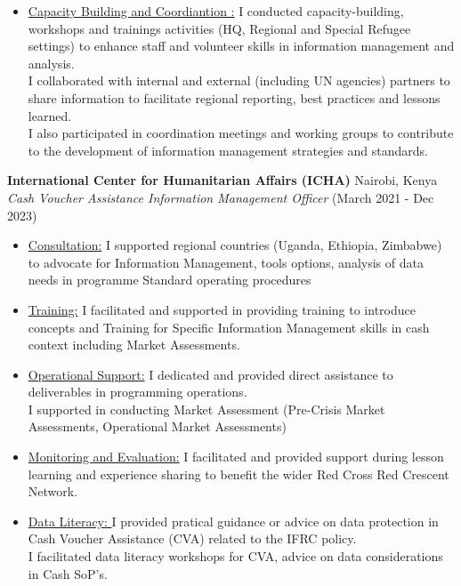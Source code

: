 \documentclass[line,margin,10pt]{res}
\begin{document}
\begin{resume}
\begin{itemize}
    \item \underline{Capacity Building and Coordiantion :}
    I conducted capacity-building, workshops and trainings activities (HQ, Regional and Special Refugee settings) to enhance staff and volunteer skills in information management and analysis.\\
    I collaborated with internal and external (including UN agencies) partners to share information to facilitate regional reporting, best practices and lessons learned.\\
    I also participated in coordination meetings and working groups to contribute to the development of information management strategies and standards.

\end{itemize}

\textbf{International Center for Humanitarian Affairs (ICHA)} \hfill Nairobi, Kenya\\
{\sl Cash Voucher Assistance Information Management Officer} \hfill (March 2021 - Dec 2023)
\begin{itemize} \itemsep -2pt
	\item \underline{Consultation:}
    I supported regional countries (Uganda, Ethiopia, Zimbabwe) to advocate for Information Management, tools options, analysis of data needs in programme Standard operating procedures
    \item \underline{Training:}
    I facilitated and supported in providing training to introduce concepts and Training for Specific Information Management skills in cash context including Market Assessments.
    \item \underline{Operational Support:}
    I dedicated and provided direct assistance to deliverables in programming operations.\\
    I supported in conducting Market Assessment (Pre-Crisis Market Assessments, Operational Market Assessments)\\
    \item \underline{Monitoring and Evaluation:}
    I facilitated and provided support during lesson learning and experience sharing to benefit the wider Red Cross Red Crescent Network.
    \item \underline{Data Literacy: }
    I provided pratical guidance or advice on data protection in Cash Voucher Assistance (CVA) related to the IFRC policy.\\
    I facilitated data literacy workshops for CVA, advice on data considerations in Cash SoP's.\\

\end{itemize}
\end{resume}
\end{document}
